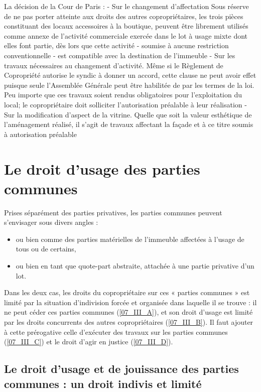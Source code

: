 			La décision de la Cour de Paris :
			- Sur le changement d’affectation
			Sous réserve de ne pas porter atteinte aux droits des autres copropriétaires, les trois pièces constituant des locaux accessoires à la boutique, peuvent être librement utilisés comme annexe de l'activité commerciale exercée dans le lot à usage mixte dont elles font partie, dès lors que cette activité - soumise à aucune restriction conventionnelle - est compatible avec la destination de l'immeuble
			- Sur les travaux nécessaires au changement d'activité.
			Même si le Règlement de Copropriété autorise le syndic à donner un accord, cette clause ne peut avoir effet puisque seule l’Assemblée Générale peut être habilitée de par les termes de la loi.
			Peu importe que ces travaux soient rendus obligatoires pour l'exploitation du local; le copropriétaire doit solliciter l'autorisation préalable à leur réalisation
			- Sur la modification d'aspect de la vitrine.
			Quelle que soit la valeur esthétique de l'aménagement réalisé, il s'agit de travaux affectant la façade et à ce titre soumis à autorisation préalable
	
\section{Le droit d’usage des parties communes}

	Prises séparément des parties privatives, les parties communes peuvent s'envisager sous divers angles :
	\begin{itemize}
		\item ou bien comme des parties matérielles de l'immeuble affectées à l'usage de tous ou de certains,
		\item ou bien en tant que quote-part abstraite, attachée à une partie privative d'un lot.
	\end{itemize}
	Dans les deux cas, les droits du copropriétaire sur ces « parties communes » est limité par la situation d’indivision forcée et organisée dans laquelle il se trouve : il ne peut céder ces parties communes (\vref{07_III_A}), et son droit d’usage est limité par les droits concurrents des autres copropriétaires (\vref{07_III_B}). Il faut ajouter à cette prérogative celle d’exécuter des travaux sur les parties communes (\vref{07_III_C}) et le droit d’agir en justice (\vref{07_III_D}).
	
	\subsection{Le droit d'usage et de jouissance des parties communes : un droit indivis et limité}\label{07_III_A}
	
